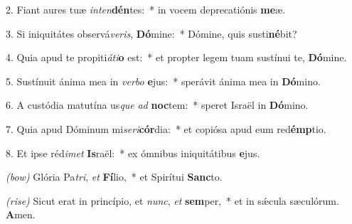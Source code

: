 2. Fiant aures tuæ \textit{in}\textit{ten}\textbf{dén}tes:~* in vocem deprecatiónis \textbf{me}æ.

3. Si iniquitátes observá\textit{ve}\textit{ris}, \textbf{Dó}mine:~* Dómine, quis susti\textbf{né}bit?

4. Quia apud te propiti\textit{á}\textit{ti}\textbf{o} est:~* et propter legem tuam sustínui te, \textbf{Dó}mine.

5. Sustínuit ánima mea in \textit{ver}\textit{bo} \textbf{e}jus:~* sperávit ánima mea in \textbf{Dó}mino.

6. A custódia matutína us\textit{que} \textit{ad} \textbf{noc}tem:~* speret Israël in \textbf{Dó}mino.

7. Quia apud Dóminum mi\textit{se}\textit{ri}\textbf{cór}dia:~* et copiósa apud eum red\textbf{émp}tio.

8. Et ipse réd\textit{i}\textit{met} \textbf{Is}raël:~* ex ómnibus iniquitátibus \textbf{e}jus.

{\color{red}\textit{(bow)}} Glória Pa\textit{tri}, \textit{et} \textbf{Fí}lio,~* et Spirítui \textbf{Sanc}to.

{\color{red}\textit{(rise)}} Sicut erat in princípio, et \textit{nunc}, \textit{et} \textbf{sem}per,~* et in s\'{\ae}cula sæculórum. \textbf{A}men.
